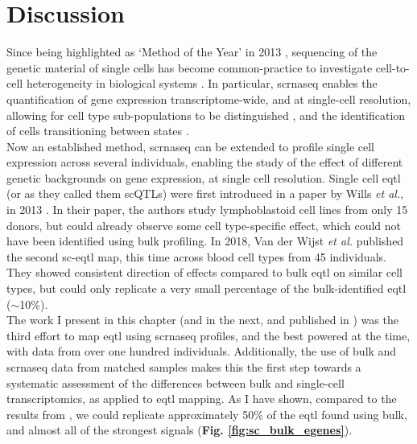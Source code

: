 \section{Discussion}

Since being highlighted as `Method of the Year' in 2013 \cite{editorial2014method}, sequencing of the genetic material of single cells has become common-practice to investigate cell-to-cell heterogeneity in biological systems \cite{lahnemann2020eleven}. 
In particular, \gls{scrnaseq} enables the quantification of gene expression  transcriptome-wide, and at single-cell resolution, allowing for cell type sub-populations to be distinguished \cite{anchang2016visualization, young2018single, muraro2016single, ernst2019staged, pijuan2019single, velten2017human}, and the identification of cells transitioning between states \cite{la2018rna, buettner2015computational, trapnell2014dynamics, bendall2014single, moignard2015decoding}. \\

Now an established method, \gls{scrnaseq} can be extended to profile single cell expression across several individuals, enabling the study of the effect of different genetic backgrounds on gene expression, at single cell resolution.
Single cell \gls{eqtl} (or as they called them scQTLs) were first introduced in a paper by Wills \textit{et al.}, in 2013 \cite{wills2013single}.
In their paper, the authors study lymphoblastoid cell lines from only 15 donors, but could already observe some cell type-specific effect, which could not have been identified using bulk profiling.
In 2018, Van der Wijst \textit{et al.} \cite{van2018single} published the second sc-\gls{eqtl} map, this time across blood cell types from 45 individuals.
They showed consistent direction of effects compared to bulk \gls{eqtl} on similar cell types, but could only replicate a very small percentage of the bulk-identified \gls{eqtl} ($\sim$10\%). \\

The work I present in this chapter (and in the next, and published in \cite{cuomo2020single}) was the third effort to map \gls{eqtl} using \gls{scrnaseq} profiles, and the best powered at the time, with data from over one hundred individuals.
Additionally, the use of bulk and \gls{scrnaseq} data from matched samples makes this the first step towards a systematic assessment of the differences between bulk and single-cell transcriptomics, as applied to \gls{eqtl} mapping.
As I have shown, compared to the results from \cite{van2018single}, we could replicate approximately 50\% of the \gls{eqtl} found using bulk, and almost all of the strongest signals (\textbf{Fig. \ref{fig:sc_bulk_egenes}}). \\

